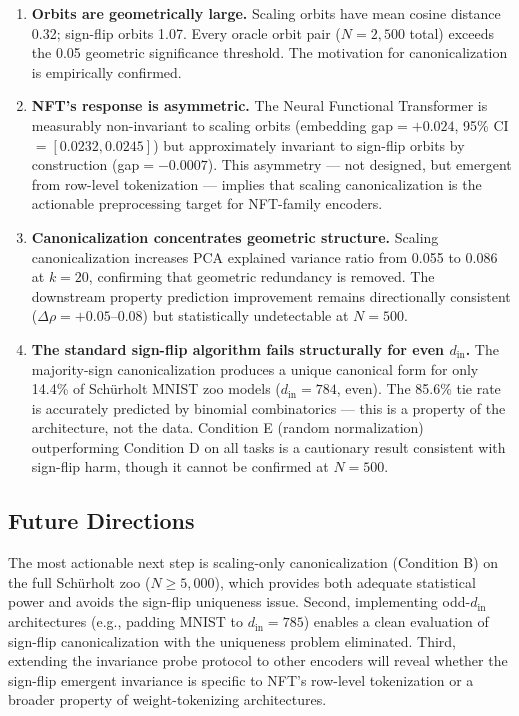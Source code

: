 \begin{enumerate}
\item \textbf{Orbits are geometrically large.} Scaling orbits have mean cosine distance 0.32; sign-flip orbits 1.07. Every oracle orbit pair ($N=2{,}500$ total) exceeds the 0.05 geometric significance threshold. The motivation for canonicalization is empirically confirmed.

\item \textbf{NFT's response is asymmetric.} The Neural Functional Transformer is measurably non-invariant to scaling orbits (embedding gap$=+0.024$, 95\% CI$=[0.0232, 0.0245]$) but approximately invariant to sign-flip orbits by construction (gap$=-0.0007$). This asymmetry --- not designed, but emergent from row-level tokenization --- implies that scaling canonicalization is the actionable preprocessing target for NFT-family encoders.

\item \textbf{Canonicalization concentrates geometric structure.} Scaling canonicalization increases PCA explained variance ratio from 0.055 to 0.086 at $k=20$, confirming that geometric redundancy is removed. The downstream property prediction improvement remains directionally consistent ($\Delta\rho = +0.05$--$0.08$) but statistically undetectable at $N=500$.

\item \textbf{The standard sign-flip algorithm fails structurally for even $d_{\mathrm{in}}$.} The majority-sign canonicalization produces a unique canonical form for only 14.4\% of Schürholt MNIST zoo models ($d_{\mathrm{in}}=784$, even). The 85.6\% tie rate is accurately predicted by binomial combinatorics --- this is a property of the architecture, not the data. Condition E (random normalization) outperforming Condition D on all tasks is a cautionary result consistent with sign-flip harm, though it cannot be confirmed at $N=500$.
\end{enumerate}

\subsection*{Future Directions}

The most actionable next step is scaling-only canonicalization (Condition B) on the full Schürholt zoo ($N \geq 5{,}000$), which provides both adequate statistical power and avoids the sign-flip uniqueness issue. Second, implementing odd-$d_{\mathrm{in}}$ architectures (e.g., padding MNIST to $d_{\mathrm{in}}=785$) enables a clean evaluation of sign-flip canonicalization with the uniqueness problem eliminated. Third, extending the invariance probe protocol to other encoders will reveal whether the sign-flip emergent invariance is specific to NFT's row-level tokenization or a broader property of weight-tokenizing architectures.

